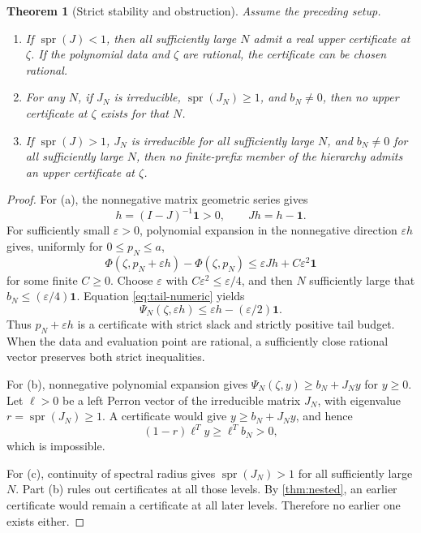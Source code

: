 \documentclass[11pt,a4paper]{article}
\newtheorem{theorem}{Theorem}[section]
\theoremstyle{definition}
\theoremstyle{remark}
\newcommand{\bone}{\boldsymbol 1}
\newcommand{\spr}{\operatorname{spr}}
\begin{document}
\begin{theorem}[Strict stability and obstruction]\label{thm:stability}
Assume the preceding setup.
\begin{enumerate}[label=(\alph*)]
\item If $\spr(J)<1$, then all sufficiently large $N$ admit a real upper
certificate at $\zeta$. If the polynomial data and $\zeta$ are rational,
the certificate can be chosen rational.
\item For any $N$, if $J_N$ is irreducible,
$\spr(J_N)\geq1$, and $b_N\ne0$, then no upper certificate at $\zeta$
exists for that $N$.
\item If $\spr(J)>1$, $J_N$ is irreducible for all sufficiently large $N$,
and $b_N\ne0$ for all sufficiently large $N$, then no finite-prefix member
of the hierarchy admits an upper certificate at $\zeta$.
\end{enumerate}
\end{theorem}
\begin{proof}
For (a), the nonnegative matrix geometric series gives
\[
 h=(I-J)^{-1}\bone>0,\qquad Jh=h-\bone.
\]
For sufficiently small $\varepsilon>0$, polynomial expansion in the
nonnegative direction $\varepsilon h$ gives, uniformly for $0\leq p_N\leq a$,
\[
 \Phi(\zeta,p_N+\varepsilon h)-\Phi(\zeta,p_N)
 \leq\varepsilon Jh+C\varepsilon^2\bone
\]
for some finite $C\geq0$. Choose $\varepsilon$ with
$C\varepsilon^2\leq\varepsilon/4$, and then $N$ sufficiently large that
$b_N\leq(\varepsilon/4)\bone$. Equation \eqref{eq:tail-numeric} yields
\[
 \Psi_N(\zeta,\varepsilon h)
 \leq\varepsilon h-(\varepsilon/2)\bone.
\]
Thus $p_N+\varepsilon h$ is a certificate with strict slack and strictly
positive tail budget. When the data and evaluation point are rational,
a sufficiently close rational vector preserves both strict inequalities.

For (b), nonnegative polynomial expansion gives
$\Psi_N(\zeta,y)\geq b_N+J_Ny$ for $y\geq0$.
Let $\ell>0$ be a left Perron vector of the irreducible matrix $J_N$,
with eigenvalue $r=\spr(J_N)\geq1$.
A certificate would give $y\geq b_N+J_Ny$, and hence
\[
 (1-r)\ell^Ty\geq\ell^Tb_N>0,
\]
which is impossible.

For (c), continuity of spectral radius gives $\spr(J_N)>1$ for all
sufficiently large $N$. Part (b) rules out certificates at all those levels.
By \cref{thm:nested}, an earlier certificate would remain a certificate at
all later levels. Therefore no earlier one exists either.
\end{proof}
\end{document}
